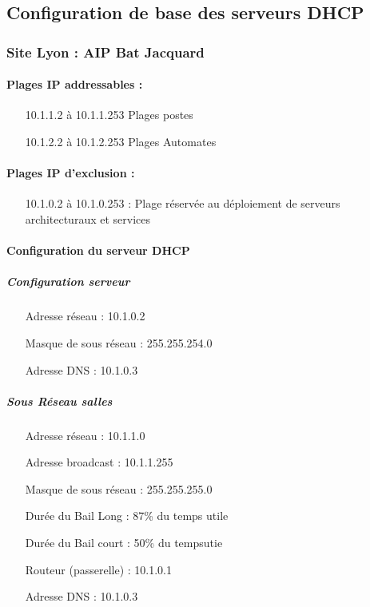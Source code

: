 \documentclass[a4paper]{article}
\begin{document}
\subsection{Configuration de base des serveurs DHCP}

\subsubsection{Site Lyon : AIP Bat Jacquard }

\paragraph{Plages IP addressables :} 
\begin{itemize}
\item[10.1.1.2 à 10.1.1.253] Plages postes
\item[10.1.2.2 à 10.1.2.253] Plages Automates
\end{itemize}


\paragraph{Plages IP d'exclusion :}
\begin{itemize}
\item[10.1.0.2 à 10.1.0.253] : Plage réservée au déploiement de serveurs architecturaux et services
\end{itemize}

\paragraph{Configuration du serveur DHCP}

\subparagraph{Configuration serveur}
\begin{itemize}
\item[Adresse réseau]: 10.1.0.2
\item[Masque de sous réseau]: 255.255.254.0
\item[Adresse DNS]: 10.1.0.3
\end{itemize}

\subparagraph{Sous Réseau salles}
\begin{itemize}
\item[Adresse réseau]: 10.1.1.0
\item[Adresse broadcast]: 10.1.1.255
\item[Masque de sous réseau]: 255.255.255.0
\item[Durée du Bail Long]: 87\% du temps utile
\item[Durée du Bail court]: 50\% du tempsutie
\item[Routeur (passerelle)]: 10.1.0.1
\item[Adresse DNS]: 10.1.0.3
\end{itemize}
\end{document}
